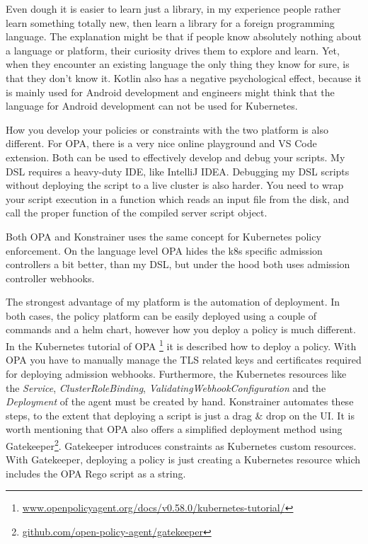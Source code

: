 Even dough it is easier to learn just a library, in my experience people rather learn something totally new, then learn a library for a foreign programming language. The explanation might be that if people know absolutely nothing about a language or platform, their curiosity drives them to explore and learn. Yet, when they encounter an existing language the only thing they know for sure, is that they don't know it. Kotlin also has a negative psychological effect, because it is mainly used for Android development and engineers might think that the language for Android development can not be used for Kubernetes.

How you develop your policies or constraints with the two platform is also different. For OPA, there is a very nice online playground and VS Code extension. Both can be used to effectively develop and debug your scripts. My DSL requires a heavy-duty IDE, like IntelliJ IDEA. Debugging my DSL scripts without deploying the script to a live cluster is also harder. You need to wrap your script execution in a function which reads an input file from the disk, and call the proper function of the compiled server script object.

Both OPA and Konstrainer uses the same concept for Kubernetes policy enforcement. On the language level OPA hides the k8s specific admission controllers a bit better, than my DSL, but under the hood both uses admission controller webhooks.

The strongest advantage of my platform is the automation of deployment. In both cases, the policy platform can be easily deployed using a couple of commands and a helm chart, however how you deploy a policy is much different. In the Kubernetes tutorial of OPA
\footnote{\url{www.openpolicyagent.org/docs/v0.58.0/kubernetes-tutorial/}} it is described how to deploy a policy. With OPA you have to manually manage the TLS related keys and certificates required for deploying admission webhooks. Furthermore, the Kubernetes resources like the \emph{Service}, \emph{ClusterRoleBinding}, \emph{ValidatingWebhookConfiguration} and the \emph{Deployment} of the agent must be created by hand. Konstrainer automates these steps, to the extent that deploying a script is just a drag \& drop on the UI. It is worth mentioning that OPA also offers a simplified deployment method using Gatekeeper\footnote{\url{github.com/open-policy-agent/gatekeeper}}. Gatekeeper introduces constraints as Kubernetes custom resources. With Gatekeeper, deploying a policy is just creating a Kubernetes resource which includes the OPA Rego script as a string.

